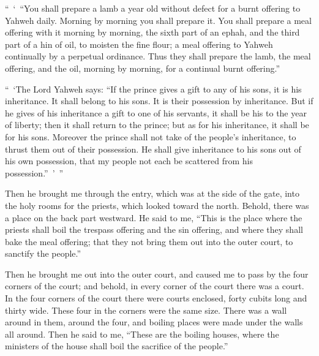 {\par }{\PP {}“ ‘ “You shall prepare a lamb a year old without defect for a burnt offering to Yahweh daily. Morning by morning you shall prepare it.
You shall prepare a meal offering with it morning by morning, the sixth part of an ephah, and the third part of a hin of oil, to moisten the fine flour; a meal offering to Yahweh continually by a perpetual ordinance.
Thus they shall prepare the lamb, the meal offering, and the oil, morning by morning, for a continual burnt offering.”
\par }{\PP {}“ ‘The Lord Yahweh says: “If the prince gives a gift to any of his sons, it is his inheritance. It shall belong to his sons. It is their possession by inheritance.
But if he gives of his inheritance a gift to one of his servants, it shall be his to the year of liberty; then it shall return to the prince; but as for his inheritance, it shall be for his sons.
Moreover the prince shall not take of the people’s inheritance, to thrust them out of their possession. He shall give inheritance to his sons out of his own possession, that my people not each be scattered from his possession.” ’ ”
\par }{\PP {}Then he brought me through the entry, which was at the side of the gate, into the holy rooms for the priests, which looked toward the north. Behold, there was a place on the back part westward.
He said to me, “This is the place where the priests shall boil the trespass offering and the sin offering, and where they shall bake the meal offering; that they not bring them out into the outer court, to sanctify the people.”
\par }{\PP {}Then he brought me out into the outer court, and caused me to pass by the four corners of the court; and behold, in every corner of the court there was a court.
In the four corners of the court there were courts enclosed, forty cubits long and thirty wide. These four in the corners were the same size.
There was a wall around in them, around the four, and boiling places were made under the walls all around.
Then he said to me, “These are the boiling houses, where the ministers of the house shall boil the sacrifice of the people.”

}
